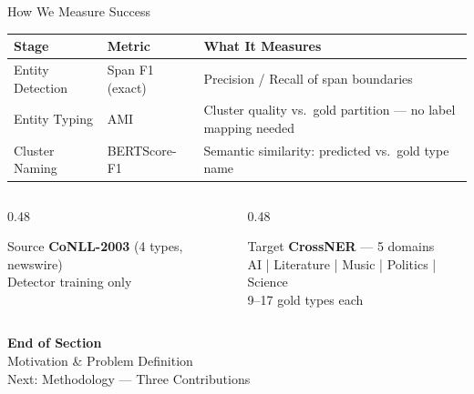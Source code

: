 \documentclass[aspectratio=169]{beamer}
\begin{document}
\begin{frame}{How We Measure Success}
  \begin{center}
  \renewcommand{\arraystretch}{1.4}
  \begin{tabular}{p{2.8cm}|p{3.2cm}|p{5.2cm}}
    \toprule
    \rowcolor{primary!15}
    \textbf{Stage} & \textbf{Metric} & \textbf{What It Measures} \\
    \midrule
    \rowcolor{rowA}
    Entity Detection
      & Span F1 (exact)
      & Precision / Recall of span boundaries \\
    \rowcolor{rowB}
    Entity Typing
      & AMI
      & Cluster quality vs.\ gold partition --- no label mapping needed \\
    \rowcolor{rowA}
    Cluster Naming
      & BERTScore-F1
      & Semantic similarity: predicted vs.\ gold type name \\
    \bottomrule
  \end{tabular}
  \end{center}
  \vspace{8pt}
  \begin{columns}[T]
    \begin{column}{0.48\textwidth}
      \begin{block}{Source}
        \textbf{CoNLL-2003} (4 types, newswire)\\
        \small Detector training only
      \end{block}
    \end{column}
    \begin{column}{0.48\textwidth}
      \begin{block}{Target}
        \textbf{CrossNER} --- 5 domains\\
        \small AI \;|\; Literature \;|\; Music \;|\; Politics \;|\; Science\\
        \small 9--17 gold types each
      \end{block}
    \end{column}
  \end{columns}
\end{frame}

\begin{frame}[plain]
  \begin{center}
    {\Large\bfseries\color{primary} End of Section}\\[12pt]
    {\large Motivation \& Problem Definition}\\[20pt]
    \textcolor{muted}{\small Next: Methodology --- Three Contributions}
  \end{center}
\end{frame}
\end{document}

